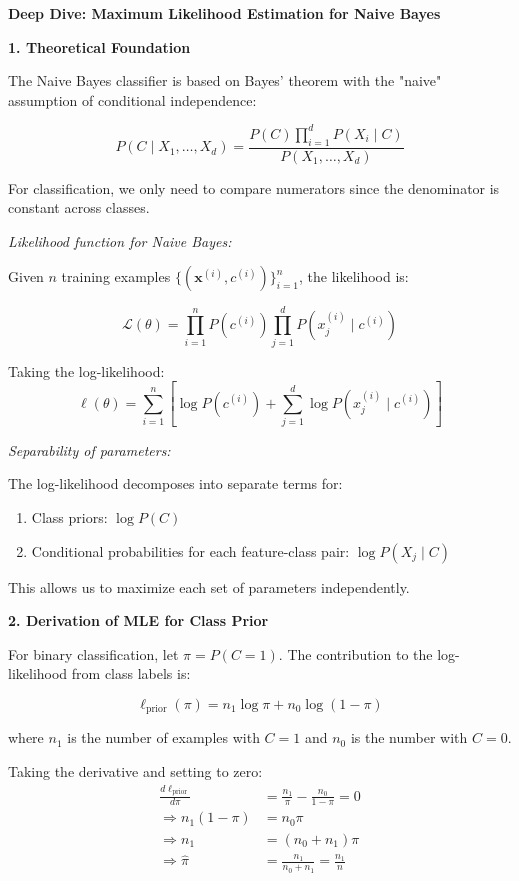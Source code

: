 \documentclass[12pt]{article}
\begin{document}
\begin{explanation}
\textbf{Deep Dive: Maximum Likelihood Estimation for Naive Bayes}

\textbf{1. Theoretical Foundation}

The Naive Bayes classifier is based on Bayes' theorem with the "naive" assumption of conditional independence:

\[
P(C \mid X_1, \ldots, X_d) = \frac{P(C) \prod_{i=1}^{d} P(X_i \mid C)}{P(X_1, \ldots, X_d)}
\]

For classification, we only need to compare numerators since the denominator is constant across classes.

\textit{Likelihood function for Naive Bayes:}

Given $n$ training examples $\{(\mathbf{x}^{(i)}, c^{(i)})\}_{i=1}^{n}$, the likelihood is:

\[
\mathcal{L}(\theta) = \prod_{i=1}^{n} P(c^{(i)}) \prod_{j=1}^{d} P(x_j^{(i)} \mid c^{(i)})
\]

Taking the log-likelihood:
\[
\ell(\theta) = \sum_{i=1}^{n} \left[\log P(c^{(i)}) + \sum_{j=1}^{d} \log P(x_j^{(i)} \mid c^{(i)})\right]
\]

\textit{Separability of parameters:}

The log-likelihood decomposes into separate terms for:
\begin{enumerate}
    \item Class priors: $\log P(C)$
    \item Conditional probabilities for each feature-class pair: $\log P(X_j \mid C)$
\end{enumerate}

This allows us to maximize each set of parameters independently.

\textbf{2. Derivation of MLE for Class Prior}

For binary classification, let $\pi = P(C = 1)$. The contribution to the log-likelihood from class labels is:

\[
\ell_{\text{prior}}(\pi) = n_1 \log \pi + n_0 \log(1 - \pi)
\]

where $n_1$ is the number of examples with $C = 1$ and $n_0$ is the number with $C = 0$.

Taking the derivative and setting to zero:
\begin{align}
\frac{d\ell_{\text{prior}}}{d\pi} &= \frac{n_1}{\pi} - \frac{n_0}{1-\pi} = 0 \\
\Rightarrow n_1(1-\pi) &= n_0 \pi \\
\Rightarrow n_1 &= (n_0 + n_1)\pi \\
\Rightarrow \hat{\pi} &= \frac{n_1}{n_0 + n_1} = \frac{n_1}{n}
\end{align}


\end{explanation}
\end{document}
